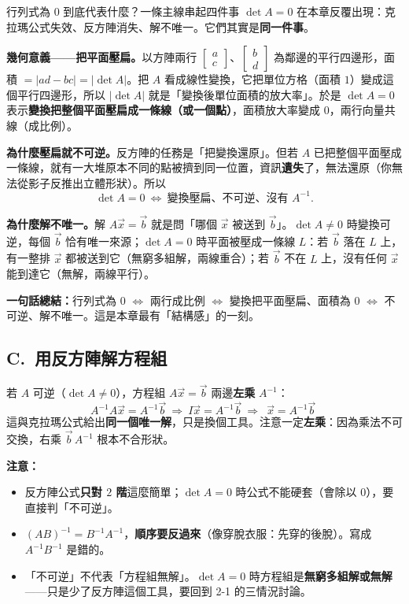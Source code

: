 \documentclass[11pt]{article}
\begin{document}
\begin{延伸框}{行列式為 $0$ 到底代表什麼？一條主線串起四件事}
$\det A=0$ 在本章反覆出現：克拉瑪公式失效、反方陣消失、解不唯一。它們其實是\textbf{同一件事}。

\textbf{幾何意義——把平面壓扁。}以方陣兩行 $\begin{bmatrix} a\\ c \end{bmatrix}$、$\begin{bmatrix} b\\ d \end{bmatrix}$ 為鄰邊的平行四邊形，面積 $=|ad-bc|=|\det A|$。把 $A$ 看成線性變換，它把單位方格（面積 $1$）變成這個平行四邊形，所以 $|\det A|$ 就是「變換後單位面積的放大率」。於是 $\det A=0$ 表示\textbf{變換把整個平面壓扁成一條線（或一個點）}，面積放大率變成 $0$，兩行向量共線（成比例）。

\textbf{為什麼壓扁就不可逆。}反方陣的任務是「把變換還原」。但若 $A$ 已把整個平面壓成一條線，就有一大堆原本不同的點被擠到同一位置，資訊\textbf{遺失}了，無法還原（你無法從影子反推出立體形狀）。所以
$$\det A=0\ \Longleftrightarrow\ \text{變換壓扁、不可逆、沒有 }A^{-1}.$$

\textbf{為什麼解不唯一。}解 $A\vec x=\vec b$ 就是問「哪個 $\vec x$ 被送到 $\vec b$」。$\det A\ne0$ 時變換可逆，每個 $\vec b$ 恰有唯一來源；$\det A=0$ 時平面被壓成一條線 $L$：若 $\vec b$ 落在 $L$ 上，有一整排 $\vec x$ 都被送到它（無窮多組解，兩線重合）；若 $\vec b$ 不在 $L$ 上，沒有任何 $\vec x$ 能到達它（無解，兩線平行）。

\textbf{一句話總結：}行列式為 $0$ $\Longleftrightarrow$ 兩行成比例 $\Longleftrightarrow$ 變換把平面壓扁、面積為 $0$ $\Longleftrightarrow$ 不可逆、解不唯一。這是本章最有「結構感」的一刻。
\end{延伸框}

\subsection*{\sffamily C.\ 用反方陣解方程組}

若 $A$ 可逆（$\det A\ne0$），方程組 $A\vec x=\vec b$ 兩邊\textbf{左乘} $A^{-1}$：
$$A^{-1}A\vec x=A^{-1}\vec b\ \Rightarrow\ I\vec x=A^{-1}\vec b\ \Rightarrow\ \boxed{\;\vec x=A^{-1}\vec b\;}$$
這與克拉瑪公式給出\textbf{同一個唯一解}，只是換個工具。注意一定\textbf{左乘}：因為乘法不可交換，右乘 $\vec b\,A^{-1}$ 根本不合形狀。

\textbf{注意：}

\begin{itemize}\setlength{\itemsep}{1pt}
\item 反方陣公式\textbf{只對 $2$ 階}這麼簡單；$\det A=0$ 時公式不能硬套（會除以 $0$），要直接判「不可逆」。
\item $(AB)^{-1}=B^{-1}A^{-1}$，\textbf{順序要反過來}（像穿脫衣服：先穿的後脫）。寫成 $A^{-1}B^{-1}$ 是錯的。
\item 「不可逆」不代表「方程組無解」。$\det A=0$ 時方程組是\textbf{無窮多組解或無解}——只是少了反方陣這個工具，要回到 2-1 的三情況討論。
\end{itemize}
\end{document}
